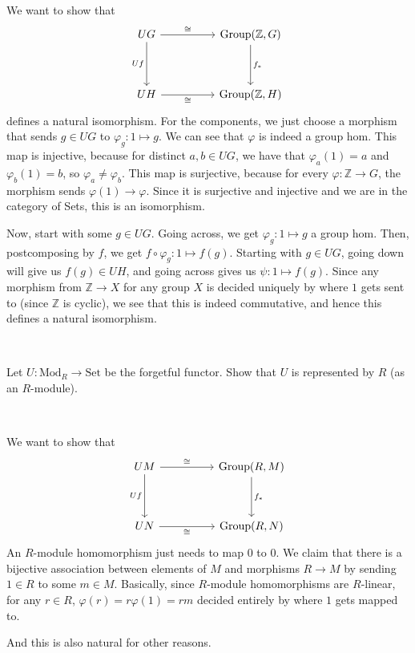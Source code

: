 \documentclass{article}
\begin{document}
\begin{customproof}
\

We want to show that \[\begin{tikzcd}[column sep = huge, row sep = huge]
	UG & \text{Group}(\mathbb{Z}, G)\\
	UH & \text{Group}(\mathbb{Z}, H)
	\arrow[from=1-1, to=1-2, "\cong"]
	\arrow[from=1-1, to=2-1, "Uf"']
	\arrow[from=2-1, to=2-2, "\cong"']
	\arrow[from=1-2, to=2-2, "f_*"]
\end{tikzcd}\]defines a natural isomorphism. For the components, we just choose a morphism that sends $g \in UG$ to $\varphi_g: 1 \mapsto g$. We can see that $\varphi$ is indeed a group hom. This map is injective, because for distinct $a, b \in UG$, we have that $\varphi_a(1) = a$ and $\varphi_b(1) = b$, so $\varphi_a \neq \varphi_b$. This map is surjective, because for every $\varphi: \mathbb{Z} \to G$, the morphism sends $\varphi(1) \to \varphi$. Since it is surjective and injective and we are in the category of Sets, this is an isomorphism.

Now, start with some $g \in UG$. Going across, we get $\varphi_g: 1 \mapsto g$ a group hom. Then, postcomposing by $f$, we get $f \circ \varphi_g: 1 \mapsto f(g)$. Starting with $g \in UG$, going down will give us $f(g) \in UH$, and going across gives us $\psi: 1 \mapsto f(g)$. Since any morphism from $\mathbb{Z} \to X$ for any group $X$ is decided uniquely by where $1$ gets sent to (since $\mathbb{Z}$ is cyclic), we see that this is indeed commutative, and hence this defines a natural isomorphism.
\end{customproof}

\begin{proposition}
\

Let $U: \text{Mod}_R \to \text{Set}$ be the forgetful functor. Show that $U$ is represented by $R$ (as an $R$-module).
\end{proposition}

\begin{customproof}
\

We want to show that \[\begin{tikzcd}[column sep = huge, row sep = huge]
	UM & \text{Group}(R, M)\\
	UN & \text{Group}(R, N)
	\arrow[from=1-1, to=1-2, "\cong"]
	\arrow[from=1-1, to=2-1, "Uf"']
	\arrow[from=2-1, to=2-2, "\cong"']
	\arrow[from=1-2, to=2-2, "f_*"]
\end{tikzcd}\]An $R$-module homomorphism just needs to map $0$ to $0$. We claim that there is a bijective association between elements of $M$ and morphisms $R \to M$ by sending $1 \in R$ to some $m \in M$. Basically, since $R$-module homomorphisms are $R$-linear, for any $r \in R$, $\varphi(r) = r \varphi(1) = rm$ decided entirely by where $1$ gets mapped to.

And this is also natural for other reasons.
\end{customproof}
\end{document}
